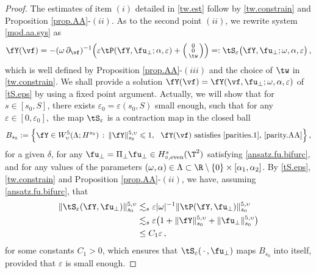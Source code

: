 \documentclass[a4paper,reqno,10pt]{article}
\newcommand{\pa}{\partial}
\begin{document}
\begin{proof}
	The estimates of  item $(i)$ detailed in \eqref{tw.est} follow by \eqref{tw.constrain} and Proposition \ref{prop.AA}-$(ii)$. As to the second point $(ii)$, we rewrite system \eqref{mod.aa.sys} as
	\begin{equation}\label{tS.eps}
		\fY(\vf) = - (\omega\,\pa_{\vf})^{-1} \Big( \varepsilon \tP(\fY,\fu_{\perp};\alpha,\varepsilon) + \Big(\begin{smallmatrix}
			0  \\ 0 \\ \tw
		\end{smallmatrix}\Big) \Big) =: \tS_{\varepsilon} \big( \fY, \fu_{\perp}; \omega,\alpha,\varepsilon \big) \,,
	\end{equation}
	which is well defined by Proposition \ref{prop.AA}-$(iii)$ and the choice of $\tw$ in \eqref{tw.constrain}.
	We shall provide a solution $\fY(\vf)=\fY(\vf,\fu_{\perp};\omega,\alpha,\varepsilon)$ of \eqref{tS.eps} by using a fixed point argument. Actually, we will show that for $s\in [s_0,S]$, there exists  $\varepsilon_0=\varepsilon(s_0,S)$ small enough, such that for any $\varepsilon\in[0,\varepsilon_0],$   the map $\tS_{\varepsilon}$ is a contraction map in the closed ball 
	\begin{equation}
		B_{s_0}:= \Big\{ \fY \in {W_\upsilon^5(\Lambda; H^{s_0})} \, : \, \|\fY\|_{s_0}^{5,\upsilon} \leqslant 1 , \ \ \fY(\vf) \ \text{satisfies \eqref{parities.1}, \eqref{parity.AA}} \Big\} \,,
	\end{equation}
	for a given $\delta$, for any $\fu_{\perp}= \Pi_{\perp} \fu_{\perp} \in H_{\circ,{\rm even}}^{s}(\T^2)$ satisfying \eqref{ansatz.fu.bifurc}, and for any values of the parameters $(\omega,\alpha ) \in\Lambda\subset \R\setminus\{0\}\times [\alpha_{1},\alpha_{2}]$. By \eqref{tS.eps}, \eqref{tw.constrain} and  Proposition \ref{prop.AA}-$(ii)$, we have, assuming \eqref{ansatz.fu.bifurc}, that
	\begin{align}\label{Low-est-S}
		\nonumber\| \tS_{\varepsilon}(\fY,\fu_{\perp}) \|_{s_0}^{5,\upsilon} & \lesssim_{s} \varepsilon |\omega|^{-1} \| \tP(\fY,\fu_{\perp}) \|_{s_0}^{5,\upsilon} \\
		\nonumber& \lesssim_{s}\varepsilon  \big(1+ \| \fY \|_{s_0}^{5,\upsilon} + \| \fu_{\perp}\|_{s_0}^{5,\upsilon} \big) \\
		& \leq C_{1} \varepsilon\,,
	\end{align}
	for some constants $C_{1}>0$, which ensures that $\tS_{\varepsilon}(\,\cdot\,, \fu_{\perp})$ maps $B_{s_0}$ into itself, provided that $\varepsilon$ is small enough.

\end{proof}
\end{document}
